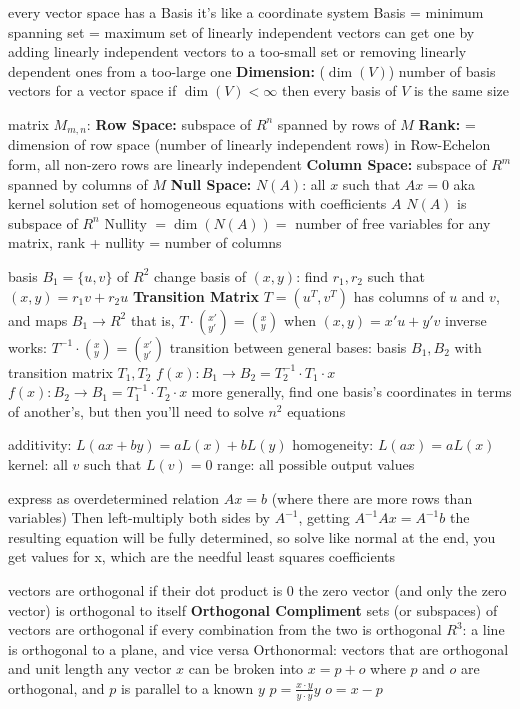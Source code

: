 \documentclass[12pt]{article}
\begin{document}
\begin{multicols*}{2}
\begin{flushleft}
\begin{outline}[longenum]
  \1 every vector space has a Basis
  \1 it's like a coordinate system
  \1 Basis = minimum spanning set = maximum set of linearly independent vectors
  \1 can get one by adding linearly independent vectors to a too-small set or removing linearly dependent ones from a too-large one
  \1 \textbf{Dimension:} ($\dim(V)$) number of basis vectors for a vector space
    \2 if $\dim(V)<\infty$ then every basis of $V$ is the same size

  \1 matrix $M_{m,n}$:
  \1 \textbf{Row Space:} subspace of $R^n$ spanned by rows of $M$
    \2 \textbf{Rank:} = dimension of row space (number of linearly independent rows)
    \2 in Row-Echelon form, all non-zero rows are linearly independent
  \1 \textbf{Column Space:} subspace of $R^m$ spanned by columns of $M$
  \1 \textbf{Null Space:} $N(A)$: all $x$ such that $Ax=0$
    \2 aka kernel
    \2 solution set of homogeneous equations with coefficients $A$
    \2 $N(A)$ is subspace of $R^n$
    \2 Nullity $=\dim(N(A))=$ number of free variables
  \1 for any matrix, rank + nullity = number of columns

  \1 basis $B_1=\{u,v\}$ of $R^2$
  \1 change basis of $(x,y)$: find $r_1,r_2$ such that $(x,y) = r_1v + r_2u$
  \1 \textbf{Transition Matrix} $T=(u^T,v^T)$ has columns of $u$ and $v$, and maps $B_1\rightarrow R^2$
    \2 that is, $T\cdot(^{x'}_{y'}) = (^x_y)$ when $(x,y)=x'u+y'v$
    \2 inverse works: $T^{-1}\cdot(^x_y) = (^{x'}_{y'})$
  \1 transition between general bases:
    \2 basis $B_1,B_2$ with transition matrix $T_1,T_2$
    \2 $f(x): B_1 \rightarrow B_2 = T_2^{-1}\cdot T_1 \cdot x $
    \2 $f(x): B_2 \rightarrow B_1 = T_1^{-1}\cdot T_2 \cdot x $
    \2 more generally, find one basis's coordinates in terms of another's, but then you'll need to solve $n^2$ equations

  \1 additivity:  $L(ax+by) = aL(x)+bL(y)$
  \1 homogeneity: $L(ax) = aL(x)$
  \1 kernel: all $v$ such that $L(v)=0$
  \1 range: all possible output values

  \1 express as overdetermined relation $Ax = b$ (where there are more rows than variables)
  \1 Then left-multiply both sides by $A^{-1}$, getting $A^{-1}Ax=A^{-1}b$
  \1 the resulting equation will be fully determined, so solve like normal
  \1 at the end, you get values for x, which are the needful least squares coefficients

  \1 vectors are orthogonal if their dot product is 0
    \2 the zero vector (and only the zero vector) is orthogonal to itself
  \1 \textbf{Orthogonal Compliment} sets (or subspaces) of vectors are orthogonal if every combination from the two is orthogonal
    \2 $R^3$: a line is orthogonal to a plane, and vice versa
  \1 Orthonormal: vectors that are orthogonal and unit length
  \1 any vector $x$ can be broken into $x=p+o$ where $p$ and $o$ are orthogonal, and $p$ is parallel to a known $y$
    \2 $p = \frac{x\cdot y}{y\cdot y}y$
    \2 $o = x - p$



\end{outline}
\end{flushleft}
\end{multicols*}
\end{document}
